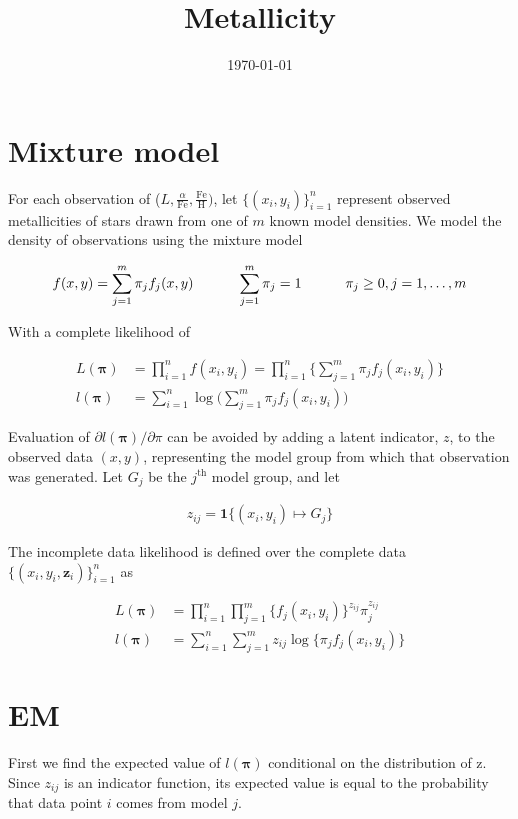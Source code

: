 \documentclass[12pt]{amsart}
\title{Metallicity}
\author{\today}
\newcommand{\vect}[1]{\boldsymbol{\mathbf{#1}}}
\newcommand{\eqn}[1]{\begin{align*}
#1
\end{align*}}
\newcommand{\shblock}{\hspace{3mm}}
\newcommand{\hblock}{\hspace{8mm}}
\newcommand{\eqnsep}{\shblock\hblock}
\newcommand{\bl}{\big\{}
\newcommand{\br}{\big\}}
\newcommand{\Bl}{\Big\{}
\newcommand{\Br}{\Big\}}
\newcommand{\indicator}{\mathbf{1}}
\newcommand{\fab}{f_j}
\newcommand{\llp}{l(\vect{\pi})}
\newcommand{\sumn}{\sum^n_{i=1}}
\newcommand{\summ}{\sum^m_{j=1}}
\begin{document}
\maketitle






\section{Mixture model}

For each observation of ($L, \frac{\alpha}{\text{Fe}}, \frac{\text{Fe}}{\text{H}})$, let $\bl (x_i,y_i) \br^n_{i=1}$ represent observed metallicities of stars drawn from one of $m$ known model densities. We model the density of observations using the mixture model

\eqn{
	f(x,y) = \summ \pi_j \fab(x,y) \eqnsep \summ \pi_j = 1 \eqnsep \pi_j \geq 0, j=1,\ldots,m
}

With a complete likelihood of

\eqn{
	L(\vect{\pi}) &= \prod^n_{i=1} f(x_i,y_i)	 = \prod^n_{i=1} \Bl  \summ \pi_j \fab(x_i,y_i)  \Br	\\
	\llp &= \sumn \log \Big( \summ \pi_j \fab(x_i,y_i)  \Big)
}

Evaluation of $\partial l(\vect{\pi})/\partial \pi$ can be avoided by adding a latent indicator, $z$, to the observed data $(x,y)$, representing the model group from which that observation was generated. Let $G_j$ be the $j^\text{th}$ model group, and let

\eqn{z_{ij} = \indicator \bl (x_i,y_i) \mapsto G_j \br}


The incomplete data likelihood is defined over the complete data $\bl (x_i,y_i,\vect{z}_i) \br^n_{i=1}$ as

\eqn{
	L(\vect{\pi}) &= \prod^n_{i=1} \prod^m_{j=1} \Bl \fab(x_i,y_i) \Br ^{z_{ij}} \pi_j^{z_{ij}}	\\
	\llp &= \sumn \summ z_{ij}  \log \bl \pi_j  \fab(x_i,y_i) \br
}





\clearpage
\section{EM}

First we find the expected value of $\llp$ conditional on the distribution of z. Since $z_{ij}$ is an indicator function, its expected value is equal to the probability that data point $i$ comes from model $j$.
\end{document}

